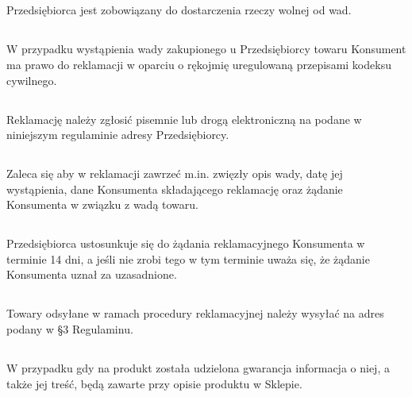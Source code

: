 \subsection{} Przedsiębiorca jest zobowiązany do dostarczenia rzeczy wolnej od wad.

			\subsection{} W przypadku wystąpienia wady zakupionego u Przedsiębiorcy towaru Konsument ma prawo do reklamacji w oparciu o rękojmię uregulowaną przepisami kodeksu cywilnego.

			\subsection{} Reklamację należy zgłosić pisemnie lub drogą elektroniczną na podane w niniejszym regulaminie adresy Przedsiębiorcy.

			\subsection{} Zaleca się aby w reklamacji zawrzeć m.in. zwięzły opis wady, datę jej wystąpienia, dane Konsumenta składającego reklamację oraz żądanie Konsumenta w związku z wadą towaru.

			\subsection{} Przedsiębiorca ustosunkuje się do żądania reklamacyjnego Konsumenta w terminie 14 dni, a jeśli nie zrobi tego w tym terminie uważa się, że żądanie Konsumenta uznał za uzasadnione.

			\subsection{} Towary odsyłane w ramach procedury reklamacyjnej należy wysyłać na adres podany w \S 3 Regulaminu.

			\subsection{} W przypadku gdy na produkt została udzielona gwarancja informacja o niej, a także jej treść, będą zawarte przy opisie produktu w Sklepie.
